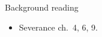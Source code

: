\documentclass[aspectratio=169,usenames,dvipsnames]{beamer}
\begin{document}
\begin{frame}{Background reading}
    \begin{itemize}
        \item Severance ch.\ 4, 6, 9.
    \end{itemize}
\end{frame}
\end{document}
